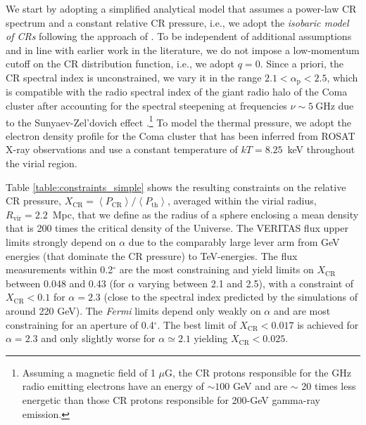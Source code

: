 \documentclass[12pt,manuscript]{aastex}
\newcommand{\expval}[1]{\left\langle #1 \right\rangle}
\newcommand{\rmn}{\mathrm}
\newcommand{\CR}{\mathrm{CR}}
\begin{document}
We start by adopting a simplified analytical model that assumes a power-law CR spectrum and a
constant relative CR pressure, i.e., we adopt the {\em isobaric model of CRs} following the approach
of \citet{article:PfrommerEnsslin:2004b}. To be independent of additional assumptions and in line
with earlier work in the literature, we do not impose a low-momentum cutoff on the CR distribution
function, i.e., we adopt $q=0$. Since a priori, the CR spectral index is unconstrained, we vary it in
the range $2.1<\alpha_{\rmn{p}}<2.5$, which is compatible with the
radio spectral index of the giant radio halo of the Coma cluster after accounting for the spectral
steepening at frequencies $\nu\sim5~\rmn{GHz}$ due to the Sunyaev-Zel'dovich effect
\citep{article:PfrommerEnsslin:2004b}.\footnote{Assuming a magnetic field of 1 $\mu$G, the CR protons
responsible for the GHz radio emitting electrons have an energy of $\sim100$ GeV and are $\sim$ 20
times less energetic than those CR protons responsible for 200-GeV gamma-ray emission.} To model
the thermal pressure, we adopt the electron density profile for the Coma cluster that has been
inferred from ROSAT X-ray observations \citep{article:BrielHenryBohringer:1992} and use a constant
temperature of $kT= 8.25$~keV throughout the virial region.

Table \ref{table:constraints_simple} shows the resulting constraints on the relative CR pressure, $X_{\CR}
= \expval{P_{\CR}}/\expval{P_\rmn{th}}$, averaged within the virial radius, $R_\rmn{vir}=2.2$~Mpc,
that we define as the radius of a sphere enclosing a mean density that is 200 times the critical
density of the Universe. The VERITAS flux upper limits strongly depend on $\alpha$ due to the
comparably large lever arm from GeV energies (that dominate the CR pressure) to TeV-energies. The
flux measurements within 0.2$^{\circ}$ are the most constraining and yield limits on $X_\CR$
between 0.048 and 0.43
(for $\alpha$ varying between 2.1 and 2.5), with a constraint of $X_\CR<0.1$ for $\alpha=2.3$ (close
to the spectral index predicted by the simulations of \citet{article:PinzkePfrommer:2010} around 220
GeV).  The {\em Fermi} limits depend only weakly on $\alpha$ and are most constraining for an
aperture of 0.4$^{\circ}$.  The best limit of $X_\CR< 0.017$ is achieved for $\alpha=2.3$ and only
slightly worse for $\alpha\simeq 2.1$ yielding $X_\CR<0.025$.

%
%
\end{document}
